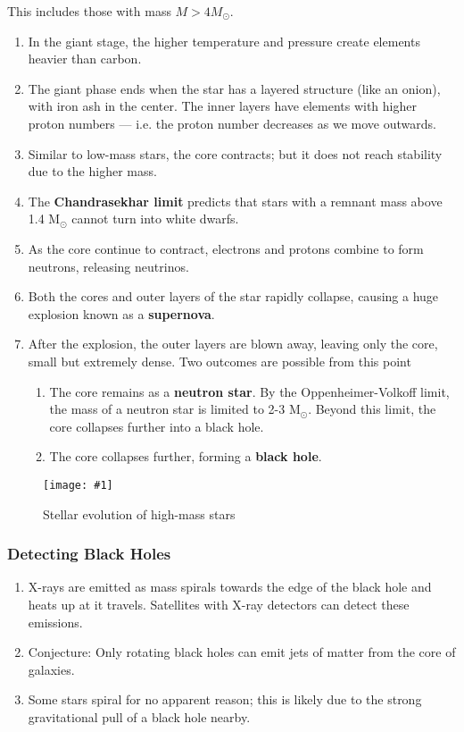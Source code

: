 \documentclass[a4paper,12pt]{article}
\newcommand{\img}[4]{\begin{center}
  \begin{figure}[H]
    \centering
    \texttt{[image: \#1]}
    \caption{#3}
    \label{fig:#4}
  \end{figure}
\end{center}}
\begin{document}
This includes those with mass $M > 4M_{\odot}$.
\begin{enumerate}
  \item In the giant stage, the higher temperature and pressure create elements heavier than carbon.
  \item The giant phase ends when the star has a layered structure (like an onion), with iron ash in the center. The inner layers have elements with higher proton numbers --- i.e. the proton number decreases as we move outwards.
  \item Similar to low-mass stars, the core contracts; but it does not reach stability due to the higher mass.
  \item The \textbf{Chandrasekhar limit} predicts that stars with a remnant mass above 1.4 M$_{\odot}$ cannot turn into white dwarfs.
  \item As the core continue to contract, electrons and protons combine to form neutrons, releasing neutrinos.
  \item Both the cores and outer layers of the star rapidly collapse, causing a huge explosion known as a \textbf{supernova}.
  \item After the explosion, the outer layers are blown away, leaving only the core, small but extremely dense. Two outcomes are possible from this point
        \begin{enumerate}
          \item The core remains as a \textbf{neutron star}. By the Oppenheimer-Volkoff limit, the mass of a neutron star is limited to 2-3 M$_{\odot}$. Beyond this limit, the core collapses further into a black hole.
          \item The core collapses further, forming a \textbf{black hole}.
        \end{enumerate}
\end{enumerate}

\img{highmass.png}{1}{Stellar evolution of high-mass stars}{highmass1}

\subsubsection{Detecting Black Holes}

\begin{enumerate}
  \item X-rays are emitted as mass spirals towards the edge of the black hole and heats up at it travels. Satellites with X-ray detectors can detect these emissions.
  \item Conjecture: Only rotating black holes can emit jets of matter from the core of galaxies.
  \item Some stars spiral for no apparent reason; this is likely due to the strong gravitational pull of a black hole nearby.
\end{enumerate}
\end{document}
